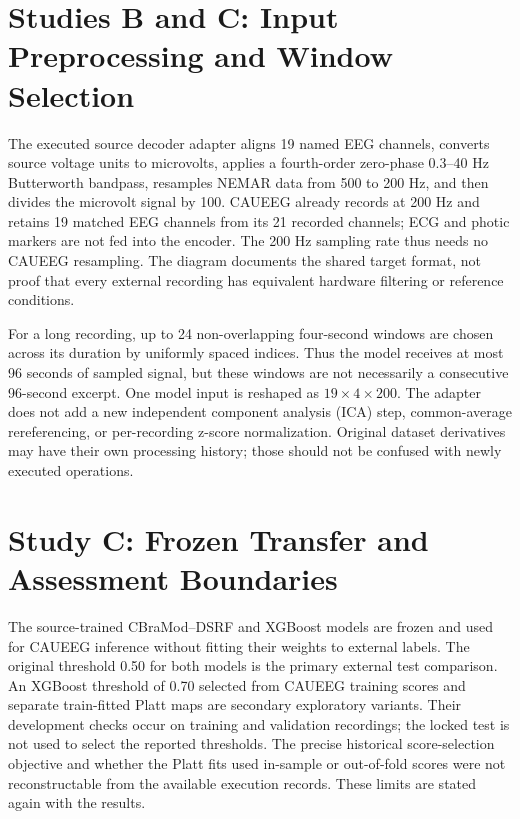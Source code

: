 \section{Studies B and C: Input Preprocessing and Window Selection}
The executed source decoder adapter aligns 19 named EEG channels, converts source voltage units to microvolts, applies a fourth-order zero-phase 0.3--40 Hz Butterworth bandpass, resamples NEMAR data from 500 to 200 Hz, and then divides the microvolt signal by 100. CAUEEG already records at 200 Hz and retains 19 matched EEG channels from its 21 recorded channels; ECG and photic markers are not fed into the encoder. The 200 Hz sampling rate thus needs no CAUEEG resampling. The diagram documents the shared target format, not proof that every external recording has equivalent hardware filtering or reference conditions.


For a long recording, up to 24 non-overlapping four-second windows are chosen across its duration by uniformly spaced indices. Thus the model receives at most 96 seconds of sampled signal, but these windows are not necessarily a consecutive 96-second excerpt. One model input is reshaped as $19\times4\times200$. The adapter does not add a new independent component analysis (ICA) step, common-average rereferencing, or per-recording z-score normalization. Original dataset derivatives may have their own processing history; those should not be confused with newly executed operations.

\section{Study C: Frozen Transfer and Assessment Boundaries}
The source-trained CBraMod--DSRF and XGBoost models are frozen and used for CAUEEG inference without fitting their weights to external labels. The original threshold 0.50 for both models is the primary external test comparison. An XGBoost threshold of 0.70 selected from CAUEEG training scores and separate train-fitted Platt maps are secondary exploratory variants. Their development checks occur on training and validation recordings; the locked test is not used to select the reported thresholds. The precise historical score-selection objective and whether the Platt fits used in-sample or out-of-fold scores were not reconstructable from the available execution records. These limits are stated again with the results.

